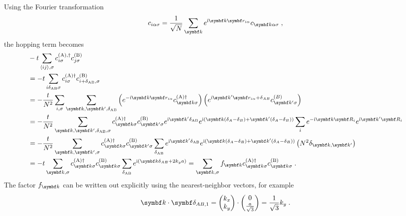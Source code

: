 \documentclass[../main.tex]{subfiles}
\begin{document}
Using the Fourier transformation
\begin{equation}
	c_{i \alpha \sigma} = \frac{1}{\sqrt{N}} \sum_{\vb{k}} e^{\iu \vb{k} \vb{r}_{i \alpha}} c_{\vb{k} \alpha \sigma} \;,
\end{equation}
the hopping term becomes
\begin{align}
	&-t \sum_{\langle ij \rangle, \sigma} c_{i \sigma}^{(\mathrm{A}), \dagger} c_{j \sigma}^{(\mathrm{B})} \\
	&= -t \sum_{i \delta_{\mathrm{AB}} \sigma} c_{i \sigma}^{(\mathrm{A}) \dagger} c_{i + \delta_{\mathrm{AB}}, \sigma}^{(\mathrm{B})} \\
	&= -\frac{t}{N^2} \sum_{i,\sigma} \sum_{\vb{k}, \vb{k}^{\prime}, \delta_{\mathrm{AB}}} \left(e^{-\iu \vb{k} \vb{r}_{i \alpha}} c_{\vb{k} \sigma}^{(\mathrm{A}) \dagger}\right) \left(e^{\iu \vb{k}^{\prime} \vb{r}_{i \alpha} +\delta_{AB}} c_{\vb{k}^{\prime} \sigma}^{(B)} \right) \\
	&= -\frac{t}{N^2} \sum_{\vb{k}, \vb{k^{\prime}}, \delta_{\mathrm{AB}}, \sigma} c_{\vb{k} \sigma}^{(\mathrm{A}) \dagger} c_{\vb{k}^{\prime} \sigma}^{(\mathrm{B})} e^{\iu \vb{k}^{\prime} \delta_{\mathrm{AB}}} e^{\iu (\vb{k} (\delta_A - \delta_B) + \vb{k}^{\prime} (\delta_A - \delta_B))} \sum_{i} e^{-\iu \vb{k} \vb{R}_i} e^{\iu \vb{k}^{\prime} \vb{R}_i} \\
	&= -\frac{t}{N^2} \sum_{\vb{k}, \vb{k^{\prime}}, \sigma}  c_{\vb{k} \sigma}^{(\mathrm{A}) \dagger} c_{\vb{k}^{\prime} \sigma}^{(\mathrm{B})} \sum_{\delta_{\mathrm{AB}}} e^{\iu \vb{k}^{\prime} \delta_{\mathrm{AB}}} e^{\iu (\vb{k} (\delta_A - \delta_B) + \vb{k}^{\prime} (\delta_A - \delta_B))} \left(N^2 \delta_{\vb{k}, \vb{k}^{\prime}} \right)\\
	&= -t \sum_{\vb{k}, \sigma}  c_{\vb{k} \sigma}^{(\mathrm{A}) \dagger} c_{\vb{k} \sigma}^{(\mathrm{B})} \sum_{\delta_{\mathrm{AB}}} e^{\iu (\vb{k} \delta_{AB} + 2 k_y a)} = \sum_{\vb{k}, \sigma} f_{\vb{k}} c_{\vb{k} \sigma}^{(\mathrm{A}) \dagger} c_{\vb{k} \sigma}^{(\mathrm{B})} \;.
\end{align}
The factor \(f_{\vb{k}}\) can be written out explicitly using the nearest-neighbor vectors, for example
\begin{align}
	\vb{k} \cdot \vb{\delta_{AB, 1}} = \begin{pmatrix} k_x \\ k_y \end{pmatrix} \cdot \begin{pmatrix} 0 \\ \frac{a}{\sqrt{3}} \end{pmatrix} = \frac{1}{\sqrt{3}} k_y \;.
\end{align}
\end{document}

